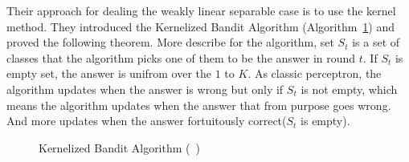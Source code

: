 Their approach for dealing the weakly linear separable case is to use
the kernel method.  They introduced the {\sc Kernelized Bandit
  Algorithm} (Algorithm~\ref{alg:kernel-bandit}) and proved the
following theorem.
More describe for the algorithm, set $S_t$ is a set of classes that the algorithm 
picks one of them to be the answer in round $t$. If $S_t$ is empty set, the answer is unifrom over the $1$ to $K$.
As classic perceptron, the algorithm updates when the answer is wrong
but only if $S_t$ is not empty, which means the algorithm updates when 
the answer that from purpose goes wrong. And more updates when the answer fortuitously correct($S_t$ is empty).
\begin{figure}[bht!]
  
  \begin{algorithm}[H]
    \SetAlgoLined
    \DontPrintSemicolon
    \end{algorithm}
    \caption{Kernelized Bandit Algorithm (~\cite{BeygelzimerPSTWZ2019-separable})}
    \label{alg:kernel-bandit}
\end{figure}

